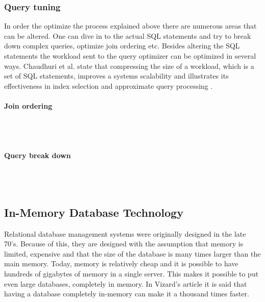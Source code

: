 \documentclass{cslthse-msc}
\begin{document}
\subsubsection{Query tuning}
In order the optimize the process explained above there are numerous areas that can be altered. One can dive in to the actual SQL statements and try to break down complex queries, optimize join ordering etc. Besides altering the SQL statements the workload sent to the query optimizer can be optimized in several ways. Chaudhuri et al. state that compressing the size of a workload, which is a set of SQL statements, improves a systems scalability and illustrates its effectiveness in index selection and approximate query processing \cite{compressing}. 
\paragraph*{Join ordering}\mbox{}\\\\

\paragraph*{Query break down}\mbox{}\\\\   

\subsection{In-Memory Database Technology}
Relational database management systems were originally designed in the late 70's\cite{Nevarez}. Because of this, they are designed with the assumption that memory is limited, expensive and that the size of the database is many times larger than the main memory. Today, memory is relatively cheap and it is possible to have hundreds of gigabytes of memory in a single server. This makes it possible to put even large databases, completely in memory. In Vizard's article\cite{Vizard12} it is said that having a database completely in-memory can make it a thousand times faster.
\end{document}
